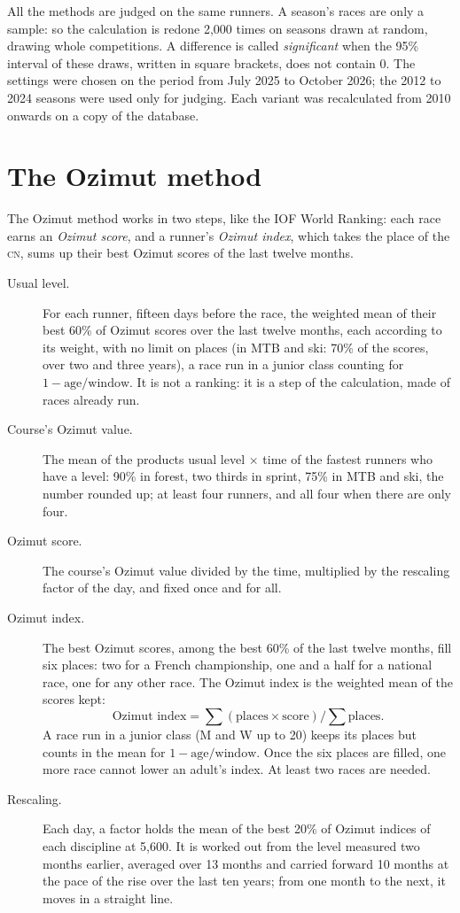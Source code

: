 \documentclass[11pt,a4paper]{article}
\newcommand{\CN}{\textsc{cn}}
\begin{document}
All the methods are judged on the same runners. A season's races are only a sample: so the calculation is redone 2,000 times on seasons drawn at random, drawing whole competitions. A difference is called \emph{significant} when the 95\% interval of these draws, written in square brackets, does not contain 0. The settings were chosen on the period from July 2025 to October 2026; the 2012 to 2024 seasons were used only for judging. Each variant was recalculated from 2010 onwards on a copy of the database.

\section{The Ozimut method}

The Ozimut method works in two steps, like the IOF World Ranking: each race earns an \emph{Ozimut score}, and a runner's \emph{Ozimut index}, which takes the place of the \CN, sums up their best Ozimut scores of the last twelve months.

\begin{description}
  \item[Usual level.] For each runner, fifteen days before the race, the weighted mean of their best 60\% of Ozimut scores over the last twelve months, each according to its weight, with no limit on places (in MTB and ski: 70\% of the scores, over two and three years), a race run in a junior class counting for $1 - \text{age} / \text{window}$. It is not a ranking: it is a step of the calculation, made of races already run.
  \item[Course's Ozimut value.] The mean of the products usual level $\times$ time of the fastest runners who have a level: 90\% in forest, two thirds in sprint, 75\% in MTB and ski, the number rounded up; at least four runners, and all four when there are only four.
  \item[Ozimut score.] The course's Ozimut value divided by the time, multiplied by the rescaling factor of the day, and fixed once and for all.
  \item[Ozimut index.] The best Ozimut scores, among the best 60\% of the last twelve months, fill six places: two for a French championship, one and a half for a national race, one for any other race. The Ozimut index is the weighted mean of the scores kept:
  \[ \text{Ozimut index} = \textstyle\sum (\text{places} \times \text{score}) \big/ \sum \text{places} . \]
  A race run in a junior class (M and W up to 20) keeps its places but counts in the mean for $1 - \text{age} / \text{window}$. Once the six places are filled, one more race cannot lower an adult's index. At least two races are needed.
  \item[Rescaling.] Each day, a factor holds the mean of the best 20\% of Ozimut indices of each discipline at 5,600. It is worked out from the level measured two months earlier, averaged over 13 months and carried forward 10 months at the pace of the rise over the last ten years; from one month to the next, it moves in a straight line.
\end{description}
\end{document}
